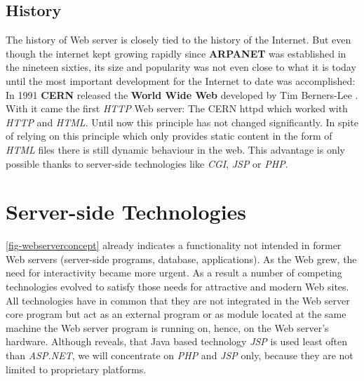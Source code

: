 \documentclass[
  a4paper,               %
  twoside,               %
  headings=small,        %
  DIV=12,                %
  BCOR=1cm,              %
  headinclude=true,      %
  footinclude=true,      %
  numbers=noenddot,      %
  11pt]{scrartcl}        %
\begin{document}
\subsection{History}

The history of Web server is closely tied to the history of the Internet. But even though the internet kept growing rapidly since \textbf{ARPANET} was established in the nineteen sixties, its size and popularity was not even close to what it is today until the most important development for the Internet to date was accomplished: In 1991 \textbf{CERN} released the \textbf{World Wide Web} developed by Tim Berners-Lee \cite{webhistory}. With it came the first \textit{HTTP} Web server: The CERN httpd which worked with \textit{HTTP} and \textit{HTML}\cite{cernHttpd}. Until now this principle has not changed significantly. In spite of relying on this principle which only provides static content in the form of \textit{HTML} files there is still dynamic behaviour in the web. This advantage is only possible thanks to server-side technologies like \textit{CGI}, \textit{JSP} or \textit{PHP}. 

\section{Server-side Technologies}

\autoref{fig-webserverconcept} already indicates a functionality not intended in former Web servers (server-side programs, database, applications). As the Web grew, the need for interactivity became more urgent. As a result a number of competing technologies evolved to satisfy those needs for attractive and modern Web sites. All technologies have in common that they are not integrated in the Web server core program but act as an external program or as module located at the same machine the Web server program is running on, hence, on the Web server's hardware. Although \cite{w3TechsStats} reveals, that Java based technology \textit{JSP} is used least often than \textit{ASP.NET}, we will concentrate on \textit{PHP} and \textit{JSP} only, because they are not limited to proprietary platforms. 
\end{document}
